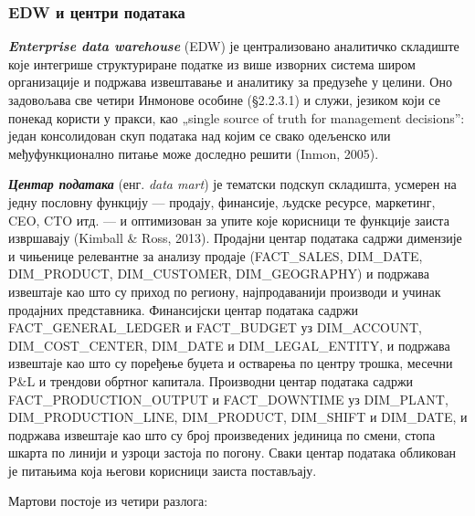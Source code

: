 \subsubsection{EDW и центри података}
\textbf{\textit{Enterprise data warehouse}} (EDW) је централизовано аналитичко складиште које интегрише структуриране податке из више изворних система широм организације и подржава извештавање и аналитику за предузеће у целини. Оно задовољава све четири Инмонове особине (§2.2.3.1) и служи, језиком који се понекад користи у пракси, као „single source of truth for management decisions”: један консолидован скуп података над којим се свако одељенско или међуфункционално питање може доследно решити (Inmon, 2005).

\textbf{\textit{Центар података}} (енг. \textit{data mart}) је тематски подскуп складишта, усмерен на једну пословну функцију — продају, финансије, људске ресурсе, маркетинг, CEO, CTO итд. — и оптимизован за упите које корисници те функције заиста извршавају (Kimball \& Ross, 2013). Продајни центар података садржи димензије и чињенице релевантне за анализу продаје (FACT\_SALES, DIM\_DATE, DIM\_PRODUCT, DIM\_CUSTOMER, DIM\_GEOGRAPHY) и подржава извештаје као што су приход по региону, најпродаванији производи и учинак продајних представника. Финансијски центар података садржи FACT\_GENERAL\_LEDGER и FACT\_BUDGET уз DIM\_ACCOUNT, DIM\_COST\_CENTER, DIM\_DATE и DIM\_LEGAL\_ENTITY, и подржава извештаје као што су поређење буџета и остварења по центру трошка, месечни P\&L и трендови обртног капитала. Производни центар података садржи FACT\_PRODUCTION\_OUTPUT и FACT\_DOWNTIME уз DIM\_PLANT, DIM\_PRODUCTION\_LINE, DIM\_PRODUCT, DIM\_SHIFT и DIM\_DATE, и подржава извештаје као што су број произведених јединица по смени, стопа шкарта по линији и узроци застоја по погону. Сваки центар података обликован је питањима која његови корисници заиста постављају.

Мартови постоје из четири разлога:

